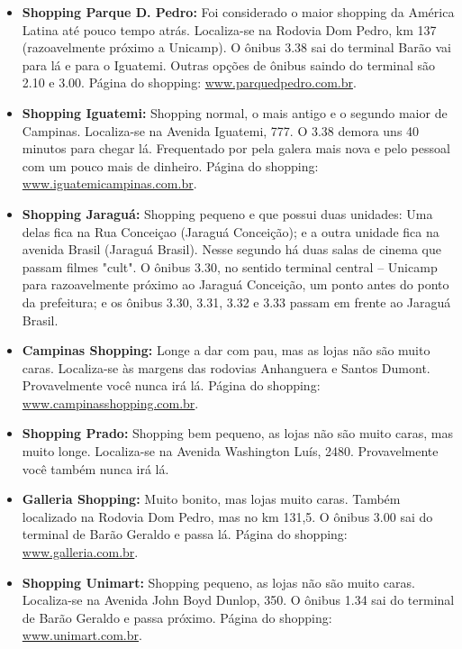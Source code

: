 \begin{itemize}

\item  \textbf{Shopping Parque D. Pedro:} Foi considerado o maior shopping da
    América Latina até pouco tempo atrás. Localiza-se na Rodovia Dom Pedro, km
    137 (razoavelmente próximo a Unicamp). O ônibus 3.38 sai do terminal Barão
    vai para lá e para o Iguatemi. Outras opções de ônibus saindo do terminal
    são 2.10 e 3.00. Página do shopping:
    \url{www.parquedpedro.com.br}.

\item  \textbf{Shopping Iguatemi:} Shopping normal, o mais antigo e o segundo
    maior de Campinas. Localiza-se na Avenida Iguatemi, 777. O 3.38 demora uns
    40 minutos para chegar lá. Frequentado por pela galera mais nova e pelo
    pessoal com um pouco mais de dinheiro. Página do shopping:
    \url{www.iguatemicampinas.com.br}.

\item  \textbf{Shopping Jaraguá:} Shopping pequeno e que possui duas unidades:
    Uma delas fica na Rua Conceiçao (Jaraguá Conceição); e a outra unidade fica
    na avenida Brasil (Jaraguá Brasil). Nesse segundo há duas salas de cinema
    que passam filmes "cult". O ônibus 3.30, no sentido terminal central --
    Unicamp para razoavelmente próximo ao Jaraguá Conceição, um ponto antes do
    ponto da prefeitura; e os ônibus 3.30, 3.31, 3.32 e 3.33 passam em frente ao
    Jaraguá Brasil.

\item  \textbf{Campinas Shopping:} Longe a dar com pau, mas as lojas não são
    muito caras. Localiza-se às margens das rodovias Anhanguera e Santos Dumont.
    Provavelmente você nunca irá lá. Página do shopping:
    \url{www.campinasshopping.com.br}.

\item  \textbf{Shopping Prado:} Shopping bem pequeno, as lojas não são muito
    caras, mas muito longe. Localiza-se na Avenida Washington Luís, 2480.
    Provavelmente você também nunca irá lá.

\item  \textbf{Galleria Shopping:} Muito bonito, mas lojas muito caras. Também
    localizado na Rodovia Dom Pedro, mas no km 131,5. O ônibus 3.00 sai do
    terminal de Barão Geraldo e passa lá. Página do shopping:
    \url{www.galleria.com.br}.

\item  \textbf{Shopping Unimart:} Shopping pequeno, as lojas não são muito
    caras. Localiza-se na Avenida John Boyd Dunlop, 350. O ônibus 1.34 sai do
    terminal de Barão Geraldo e passa próximo. Página do shopping:
    \url{www.unimart.com.br}.

\end{itemize}
